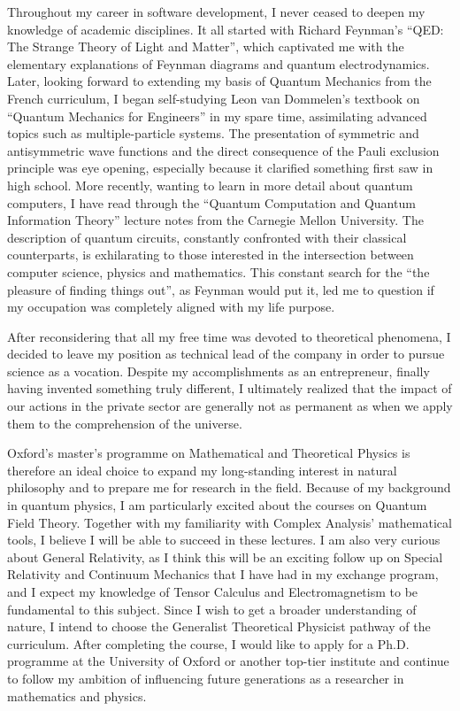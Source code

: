 \documentclass[10pt]{article}
\begin{document}
Throughout my career in software development, I never ceased to deepen my knowledge of academic disciplines. It all started with Richard Feynman's ``QED: The Strange Theory of Light and Matter'', which captivated me with the elementary explanations of Feynman diagrams and quantum electrodynamics. Later, looking forward to extending my basis of Quantum Mechanics from the French curriculum, I began self-studying Leon van Dommelen's textbook on ``Quantum Mechanics for Engineers'' in my spare time, assimilating advanced topics such as multiple-particle systems. The presentation of symmetric and antisymmetric wave functions and the direct consequence of the Pauli exclusion principle was eye opening, especially because it clarified something first saw in high school. More recently, wanting to learn in more detail about quantum computers, I have read through the ``Quantum Computation and Quantum Information Theory'' lecture notes from the Carnegie Mellon University. The description of quantum circuits, constantly confronted with their classical counterparts, is exhilarating to those interested in the intersection between computer science, physics and mathematics. This constant search for the ``the pleasure of finding things out'', as Feynman would put it, led me to question if my occupation was completely aligned with my life purpose.

After reconsidering that all my free time was devoted to theoretical phenomena, I decided to leave my position as technical lead of the company in order to pursue science as a vocation. Despite my accomplishments as an entrepreneur, finally having invented something truly different, I ultimately realized that the impact of our actions in the private sector are generally not as permanent as when we apply them to the comprehension of the universe.

Oxford's master's programme on Mathematical and Theoretical Physics is therefore an ideal choice to expand my long-standing interest in natural philosophy and to prepare me for research in the field. Because of my background in quantum physics, I am particularly excited about the courses on Quantum Field Theory. Together with my familiarity with Complex Analysis' mathematical tools, I believe I will be able to succeed in these lectures. I am also very curious about General Relativity, as I think this will be an exciting follow up on Special Relativity and Continuum Mechanics that I have had in my exchange program, and I expect my knowledge of Tensor Calculus and Electromagnetism to be fundamental to this subject. Since I wish to get a broader understanding of nature, I intend to choose the Generalist Theoretical Physicist pathway of the curriculum. After completing the course, I would like to apply for a Ph.D. programme at the University of Oxford or another top-tier institute and continue to follow my ambition of influencing future generations as a researcher in mathematics and physics.

\end{document}

